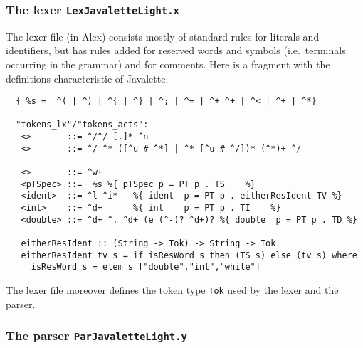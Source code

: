 \documentclass[10pt]{article}
\begin{document}
\subsubsection{The lexer {\tt LexJavaletteLight.x}}

The lexer file (in Alex) consists mostly of standard rules
for literals and identifiers, but has
rules added for reserved words and symbols (i.e.\ terminals
occurring in the grammar) and for comments. Here is
a fragment with the definitions characteristic of
Javalette.
\small
\begin{verbatim}
  { %s =  ^( | ^) | ^{ | ^} | ^; | ^= | ^+ ^+ | ^< | ^+ | ^*}

  "tokens_lx"/"tokens_acts":-
   <>       ::= ^/^/ [.]* ^n
   <>       ::= ^/ ^* ([^u # ^*] | ^* [^u # ^/])* (^*)+ ^/

   <>       ::= ^w+
   <pTSpec> ::=  %s %{ pTSpec p = PT p . TS    %}
   <ident>  ::= ^l ^i*   %{ ident  p = PT p . eitherResIdent TV %}
   <int>    ::= ^d+      %{ int    p = PT p . TI    %}
   <double> ::= ^d+ ^. ^d+ (e (^-)? ^d+)? %{ double  p = PT p . TD %}

   eitherResIdent :: (String -> Tok) -> String -> Tok
   eitherResIdent tv s = if isResWord s then (TS s) else (tv s) where
     isResWord s = elem s ["double","int","while"]
\end{verbatim}
\normalsize
The lexer file moreover defines the token type {\tt Tok} used by
the lexer and the parser.



\subsubsection{The parser {\tt ParJavaletteLight.y}}
\end{document}
